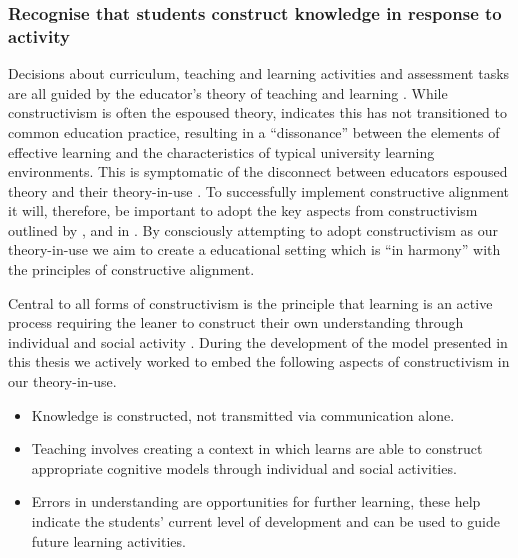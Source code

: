 
\subsubsection{Recognise that students construct knowledge in response to activity} %
\label{ssub:ideas_adopted_from_constructivism}

Decisions about curriculum, teaching and learning activities and assessment tasks are all guided by the educator's theory of teaching and learning \cite{Argyris:1976,Ramsden:1992}. While constructivism is often the espoused theory, \citet{Phillips:2005} indicates this has not transitioned to common education practice, resulting in a ``dissonance'' between the elements of effective learning and the characteristics of typical university learning environments. This is symptomatic of the disconnect between educators espoused theory and their theory-in-use \cite{Argyris:1976}. To successfully implement constructive alignment it will, therefore, be important to adopt the key aspects from constructivism outlined by \citet{Biggs:1996c}, \citet{Biggs:1997} and in \citet{Biggs:2007}. By consciously attempting to adopt constructivism as our theory-in-use we aim to create a educational setting which is ``in harmony'' with the principles of constructive alignment.

Central to all forms of constructivism is the principle that learning is an active process requiring the leaner to construct their own understanding through individual and social activity \cite{Biggs:1996c,Cunningham:1996,Duffy:1992,Glasersfeld:1989,Steffe:1995}. During the development of the model presented in this thesis we actively worked to embed the following aspects of constructivism in our theory-in-use.

\begin{itemize}
	\item Knowledge is constructed, not transmitted via communication alone.
	\item Teaching involves creating a context in which learns are able to construct appropriate cognitive models through individual and social activities.
	\item Errors in understanding are opportunities for further learning, these help indicate the students' current level of development and can be used to guide future learning activities.
\end{itemize}

